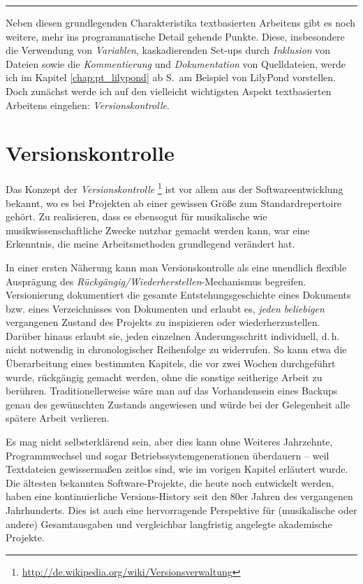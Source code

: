 \documentclass[DIV=12]{scrreprt}
\begin{document}
\bigskip
\hrule
\bigskip

Neben diesen grundlegenden Charakteristika textbasierten Arbeitens gibt es noch weitere, mehr ins programmatische Detail gehende Punkte.
Diese, insbesondere die Verwendung von \emph{Variablen}, kaskadierenden Set-ups durch \emph{Inklusion} von Dateien sowie die \emph{Kommentierung} und \emph{Dokumentation} von Quelldateien, werde ich im Kapitel \ref{chap:pt_lilypond} ab S.\,\pageref{chap:pt_lilypond} am Beispiel von LilyPond vorstellen.
Doch zunächst werde ich auf den vielleicht wichtigsten Aspekt textbasierten Arbeitens eingehen: \emph{Versionskontrolle}.

\chapter{Versionskontrolle}
\label{chap:pt_version-control}
Das Konzept der \emph{Versionskontrolle}%
\footnote{\url{http://de.wikipedia.org/wiki/Versionsverwaltung}}
ist vor allem aus der Softwareentwicklung bekannt, wo es bei Projekten ab einer gewissen Größe zum Standardrepertoire gehört.
Zu realisieren, dass es ebensogut für musikalische wie musikwissenschaftliche Zwecke nutzbar gemacht werden kann, war eine Erkenntnis, die meine Arbeitsmethoden grundlegend verändert hat.

In einer ersten Näherung kann man Versionskontrolle als eine unendlich flexible Ausprägung des \emph{Rückgängig/Wiederherstellen}-Mechanismus begreifen.
Versionierung dokumentiert die gesamte Entstehungsgeschichte eines Dokuments bzw. eines Verzeichnisses von Dokumenten und erlaubt es, \emph{jeden beliebigen} vergangenen Zustand des Projekts zu inspizieren oder wiederherzustellen.
Darüber hinaus erlaubt sie, jeden einzelnen Änderungsschritt individuell, d.\,h. nicht notwendig in chronologischer Reihenfolge zu widerrufen.
So kann etwa die Überarbeitung eines bestimmten Kapitels, die vor zwei Wochen durchgeführt wurde, rückgängig gemacht werden, ohne die sonstige seitherige Arbeit zu berühren.
Traditionellerweise wäre man auf das Vorhandensein eines Backups genau des gewünschten Zustands angewiesen und würde bei der Gelegenheit alle spätere Arbeit verlieren.

Es mag nicht selbsterklärend sein, aber dies kann ohne Weiteres Jahrzehnte, Programmwechsel und sogar Betriebssystemgenerationen überdauern -- weil Textdateien gewissermaßen zeitlos sind, wie im vorigen Kapitel erläutert wurde.
Die ältesten bekannten Software-Projekte, die heute noch entwickelt werden, haben eine kontinuierliche Versions-History seit den 80er Jahren des vergangenen Jahrhunderts.
Dies ist auch eine hervorragende Perspektive für (musikalische oder andere) Gesamtausgaben und vergleichbar langfristig angelegte akademische Projekte.
\end{document}
